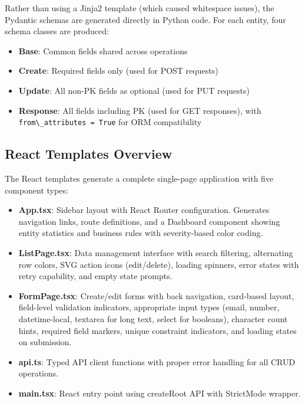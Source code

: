 \documentclass[11pt,a4paper]{article}
\begin{document}
{Rather than using a Jinja2 template (which caused whitespace issues), the Pydantic schemas are generated directly in Python code. For each entity, four schema classes are produced:

\begin{itemize}
    \item \textbf{Base}: Common fields shared across operations
    \item \textbf{Create}: Required fields only (used for POST requests)
    \item \textbf{Update}: All non-PK fields as optional (used for PUT requests)
    \item \textbf{Response}: All fields including PK (used for GET responses), with {\lstinline|from\_attributes = True|} for ORM compatibility
\end{itemize}

\subsection{React Templates Overview}

The React templates generate a complete single-page application with five component types:

\begin{itemize}
    \item \textbf{App.tsx}: Sidebar layout with React Router configuration. Generates navigation links, route definitions, and a Dashboard component showing entity statistics and business rules with severity-based color coding.
    \item \textbf{ListPage.tsx}: Data management interface with search filtering, alternating row colors, SVG action icons (edit/delete), loading spinners, error states with retry capability, and empty state prompts.
    \item \textbf{FormPage.tsx}: Create/edit forms with back navigation, card-based layout, field-level validation indicators, appropriate input types (email, number, datetime-local, textarea for long text, select for booleans), character count hints, required field markers, unique constraint indicators, and loading states on submission.
    \item \textbf{api.ts}: Typed API client functions with proper error handling for all CRUD operations.
    \item \textbf{main.tsx}: React entry point using createRoot API with StrictMode wrapper.
\end{itemize}

}
\end{document}

